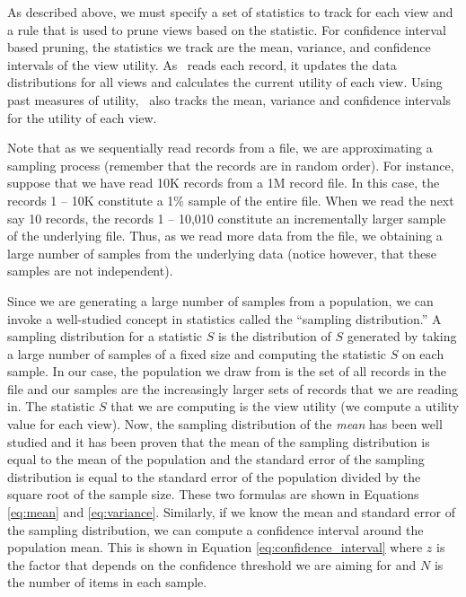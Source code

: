 As described above, we must specify
a set of statistics to track for each view and a rule that is used to
prune views based on the statistic.
For confidence interval based pruning, the statistics we track are the mean, 
variance, and confidence intervals of the view utility.
As \VizRecDB\ reads each record, it updates the data
distributions for all views and calculates the current utility of each view. 
Using past measures of utility, \VizRecDB\ also tracks the mean,
variance and confidence intervals for the utility of each view.

Note that as we sequentially read records from a file, we are
approximating a sampling process (remember that the records are in random order).
For instance, suppose that we have read 10K records from a 1M record file.
In this case, the records 1 -- 10K constitute a 1\% sample of the entire file.
When we read the next say 10 records, the records 1 -- 10,010 constitute an
incrementally larger sample of the underlying file.
Thus, as we read more data from the file, we obtaining a large
number of samples from the underlying data (notice however, that these samples
are not independent).

Since we are generating a large number of samples from a population, we can
invoke a well-studied concept in statistics called the ``sampling distribution.'' 
A sampling distribution for a statistic $S$ is the distribution of
$S$ generated by taking a large number of samples of a fixed size and computing
the statistic $S$ on each sample.
In our case, the population we draw from is the set of all records in the file
and our samples are the increasingly larger sets of records that we are reading in.
The statistic $S$ that we are computing is the view utility (we
compute a utility value for each view).
Now, the sampling distribution of the {\it mean} has been well studied and it
has been proven that the mean of the sampling distribution is equal to the mean of the
population and the standard error of the sampling distribution is equal to the
standard error of the population divided by the square root of the sample size. 
These two formulas are shown in Equations \ref{eq:mean} and \ref{eq:variance}.
Similarly, if we know the mean and standard error of the sampling distribution,
we can compute a confidence interval around the population mean. This is shown
in Equation \ref{eq:confidence_interval} where $z$ is the factor that depends on the
confidence threshold we are aiming for and $N$ is the number of items
in each sample.

